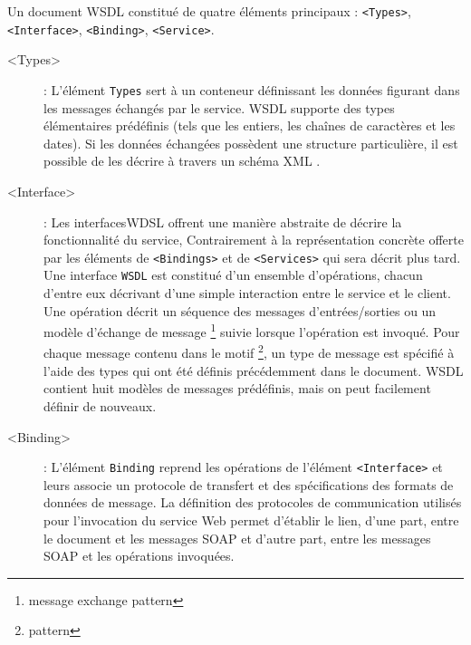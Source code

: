     Un document \textsc{WSDL} constitué de quatre éléments principaux
    \cite{chinnici2007web}: \texttt{<Types>}, \texttt{<Interface>},
    \texttt{<Binding>}, \texttt{<Service>}.

    \cite{baryannis2010} \cite{elie2010} \cite{lopez2008selection}
    \renewcommand{\descriptionlabel}[1]{\hspace{1.5cm}\texttt{#1}}
    \begin{description} %
      
    \item[<Types>]: L'élément \texttt{Types} sert à un conteneur
      définissant les données figurant dans les messages échangés par le
      service. \textsc{WSDL} supporte des types élémentaires prédéfinis
      (tels que les entiers, les chaînes de caractères et les dates). Si
      les données échangées possèdent une structure particulière, il est
      possible de les décrire à travers un schéma XML \cite{part20012}.
      
    \item[<Interface>]: Les interfaces\textsc{WDSL} offrent une manière
      abstraite de décrire la fonctionnalité du service, Contrairement à
      la représentation concrète offerte par les éléments de
      \texttt{<Bindings>} et de \texttt{<Services>} qui sera décrit plus
      tard.  Une interface \texttt{WSDL} est constitué d'un ensemble
      d'opérations, chacun d'entre eux décrivant d'une simple interaction
      entre le service et le client. Une opération décrit un séquence des
      messages d'entrées/sorties ou un modèle d'échange de message
      \footnote{message exchange pattern} suivie lorsque l'opération est
      invoqué. Pour chaque message contenu dans le motif
      \footnote{pattern}, un type de message est spécifié à l'aide des
      types qui ont été définis précédemment dans le document.
      \textsc{WSDL} contient huit modèles de messages prédéfinis, mais on
      peut facilement définir de nouveaux.
    \item[<Binding>]: \cite{elie2010} \cite{baryannis2010} L'élément
      \texttt{Binding} reprend les opérations de l'élément
      \texttt{<Interface>} et leurs associe un protocole de transfert et
      des spécifications des formats de données de message.  La définition
      des protocoles de communication utilisés pour l'invocation du
      service Web permet d'établir le lien, d'une part, entre le document
      et les messages \textsc{SOAP} et d'autre part, entre les messages
      \textsc{SOAP} et les opérations invoquées.


\end{description}
